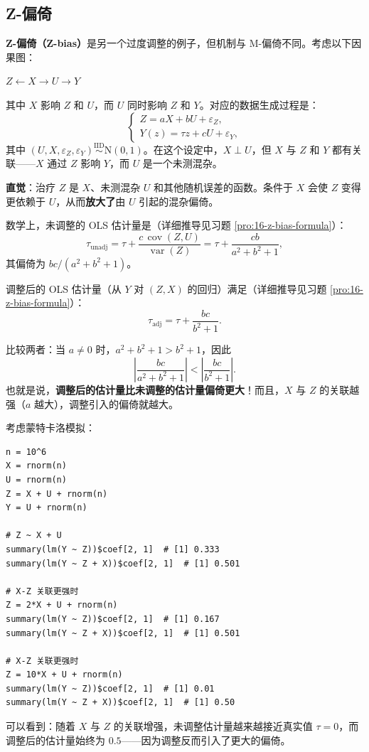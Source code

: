 \subsection{Z-偏倚}\label{sec:16-z-bias}

\textbf{Z-偏倚（Z-bias）}是另一个过度调整的例子，但机制与 M-偏倚不同。考虑以下因果图：

\begin{center}
$Z \leftarrow X \rightarrow U \rightarrow Y$
\end{center}

其中 $X$ 影响 $Z$ 和 $U$，而 $U$ 同时影响 $Z$ 和 $Y$。对应的数据生成过程是：
\[
\begin{cases}
Z = a X + b U + \varepsilon_Z, \\
Y(z) = \tau z + c U + \varepsilon_Y,
\end{cases}
\label{eq:16-z-bias-dgp}
\tag{16.14}
\]
其中 $(U, X, \varepsilon_Z, \varepsilon_Y) \stackrel{\mathrm{IID}}{\sim} \mathrm{N}(0, 1)$。在这个设定中，$X \perp U$，但 $X$ 与 $Z$ 和 $Y$ 都有关联——$X$ 通过 $Z$ 影响 $Y$，而 $U$ 是一个未测混杂。

\textbf{直觉}：治疗 $Z$ 是 $X$、未测混杂 $U$ 和其他随机误差的函数。条件于 $X$ 会使 $Z$ 变得更依赖于 $U$，从而\textbf{放大了}由 $U$ 引起的混杂偏倚。

数学上，未调整的 OLS 估计量是（详细推导见习题 \ref{pro:16-z-bias-formula}）：
\[
\tau_{\mathrm{unadj}} = \tau + \frac{c \, \operatorname{cov}(Z, U)}{\operatorname{var}(Z)}
= \tau + \frac{c b}{a^2 + b^2 + 1} ,
\label{eq:16-z-bias-unadj}
\tag{16.15}
\]
其偏倚为 $b c / (a^2 + b^2 + 1)$。

调整后的 OLS 估计量（从 $Y$ 对 $(Z, X)$ 的回归）满足（详细推导见习题 \ref{pro:16-z-bias-formula}）：
\[
\tau_{\mathrm{adj}} = \tau + \frac{b c}{b^2 + 1} .
\label{eq:16-z-bias-adj}
\tag{16.16}
\]

比较两者：当 $a \neq 0$ 时，$a^2 + b^2 + 1 > b^2 + 1$，因此
\[
\left| \frac{b c}{a^2 + b^2 + 1} \right| < \left| \frac{b c}{b^2 + 1} \right| .
\label{eq:16-z-bias-comparison}
\tag{16.17}
\]
也就是说，\textbf{调整后的估计量比未调整的估计量偏倚更大}！而且，$X$ 与 $Z$ 的关联越强（$a$ 越大），调整引入的偏倚就越大。

\begin{Example}[Z-偏倚的数值演示]\label{ex:16-z-bias-simulation}
考虑蒙特卡洛模拟：
\begin{verbatim}
n = 10^6
X = rnorm(n)
U = rnorm(n)
Z = X + U + rnorm(n)
Y = U + rnorm(n)

# Z ~ X + U
summary(lm(Y ~ Z))$coef[2, 1]  # [1] 0.333
summary(lm(Y ~ Z + X))$coef[2, 1]  # [1] 0.501

# X-Z 关联更强时
Z = 2*X + U + rnorm(n)
summary(lm(Y ~ Z))$coef[2, 1]  # [1] 0.167
summary(lm(Y ~ Z + X))$coef[2, 1]  # [1] 0.501

# X-Z 关联更强时
Z = 10*X + U + rnorm(n)
summary(lm(Y ~ Z))$coef[2, 1]  # [1] 0.01
summary(lm(Y ~ Z + X))$coef[2, 1]  # [1] 0.50
\end{verbatim}
可以看到：随着 $X$ 与 $Z$ 的关联增强，未调整估计量越来越接近真实值 $\tau = 0$，而调整后的估计量始终为 $0.5$——因为调整反而引入了更大的偏倚。
\end{Example}

